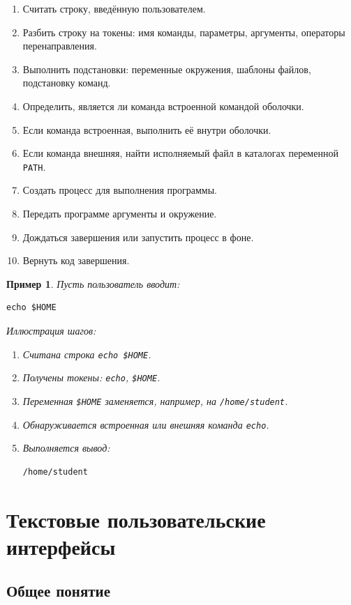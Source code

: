 \documentclass[12pt,a4paper]{article}
\newtheorem{example}{Пример}
\begin{document}
\begin{enumerate}
    \item Считать строку, введённую пользователем.
    \item Разбить строку на токены: имя команды, параметры, аргументы, операторы перенаправления.
    \item Выполнить подстановки: переменные окружения, шаблоны файлов, подстановку команд.
    \item Определить, является ли команда встроенной командой оболочки.
    \item Если команда встроенная, выполнить её внутри оболочки.
    \item Если команда внешняя, найти исполняемый файл в каталогах переменной \texttt{PATH}.
    \item Создать процесс для выполнения программы.
    \item Передать программе аргументы и окружение.
    \item Дождаться завершения или запустить процесс в фоне.
    \item Вернуть код завершения.
\end{enumerate}

\begin{example}
Пусть пользователь вводит:
\begin{lstlisting}
echo $HOME
\end{lstlisting}

Иллюстрация шагов:
\begin{enumerate}
    \item Считана строка \texttt{echo \$HOME}.
    \item Получены токены: \texttt{echo}, \texttt{\$HOME}.
    \item Переменная \texttt{\$HOME} заменяется, например, на \texttt{/home/student}.
    \item Обнаруживается встроенная или внешняя команда \texttt{echo}.
    \item Выполняется вывод:
\begin{lstlisting}
/home/student
\end{lstlisting}
\end{enumerate}
\end{example}

\section{Текстовые пользовательские интерфейсы}

\subsection{Общее понятие}
\end{document}
